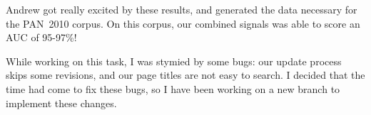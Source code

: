 Andrew got really excited by these results, and generated the data
necessary for the PAN~2010 corpus.
On this corpus, our combined signals was able to score an AUC of 95-97\%!

While working on this task, I was stymied by some \wikitrust bugs:
our update process skips some revisions, and our page titles are not
easy to search.
I decided that the time had come to fix these bugs, so I have been
working on a new branch to implement these changes.


